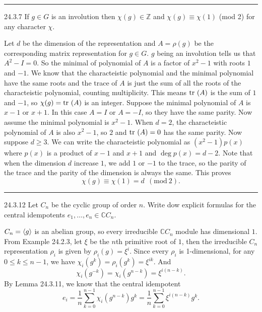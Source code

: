 \documentclass[a4paper, 12pt]{article}
\begin{document}
\noindent\rule{7in}{2.8pt}
\begin{problem}{24.3.7}
If \(g\in G\) is an involution then \(\chi(g)\in \mathbb{Z}\) and \(\chi(g)\equiv \chi(1)\) (mod 2) for any character \(\chi\).
\end{problem}
\begin{solution}
Let \(d\) be the dimension of the representation and \(A=\rho(g)\) be the corresponding matrix representation for \(g\in G\). \(g\) being an involution tells us that 
\(A^2-I=0\). So the minimal of polynomial of \(A\) is a factor of \(x^2-1\) with roots \(1\) and \(-1\). We know that the characteistic polynomial and the minimal polynomial have the same roots and the trace of 
\(A\) is just the sum of all the roots of the characteistic polynomial, counting multiplicity. This means \(\text{tr}\ (A)\) is the sum of \(1\) and \(-1\), so \(\chi(g)=\text{tr}\ (A)\) is an integer. Suppose the minimal polynomial of \(A\) is 
\(x-1\) or \(x+1\). In this case \(A=I\) or \(A=-I\), so they have the same parity. Now assume the minimal polynomial is \(x^2-1\). When \(d=2\), the characteistic polynomial of \(A\) is also \(x^2-1\), so \(2\) and \(\text{tr}\ (A)=0\) has the same parity. Now suppose \(d\geq 3\). We can 
write the characteistic polynomial as \((x^2-1)p(x)\) where \(p(x)\) is a product of \(x-1\) and \(x+1\) and \(\deg p(x)=d-2\). Note that when the dimension \(d\) increase \(1\), we add \(1\) or \(-1\) to the trace, so the 
parity of the trace and the parity of the dimension is always the same. This proves 
\[\chi(g)\equiv \chi(1)=d\ \  (\text{mod}\  2).\] 
\end{solution}

\noindent\rule{7in}{2.8pt}
\begin{problem}{24.3.12}
Let \(C_n\) be the cyclic group of order \(n\). Write dow explicit formulas for the central idempotents \(e_1,\ldots,e_n\in \mathbb{C}C_n\).
\end{problem}
\begin{solution}
\(C_n=\langle g\rangle\) is an abelian group, so every irreducible \(\mathbb{C}C_n\) module has dimensional \(1\). From Example 24.2.3, let \(\xi\) be the \(n\)th primitive root of \(1\), then the irreducible 
\(C_n\) representation \(\rho_i\) is given by \(\rho_i(g)=\xi^i\). Since every \(\rho_i\) is 1-dimensional, for any \(0\leq k\leq n-1\), we have \(\chi_i(g^k)=\rho_i(g^k)=\xi^{ik}\). And 
\[\chi_i(g^{-k})=\chi_i(g^{n-k})=\xi^{i(n-k)}.\]
By Lemma 24.3.11, we know that the central idempotent 
\[e_i=\frac{1}{n}\sum_{k=0}^{n-1} \chi_i(g^{n-k})g^k=\frac{1}{n}\sum_{k=0}^{n-1}\xi^{i(n-k)}g^k.\] 	
\end{solution}
\end{document}
